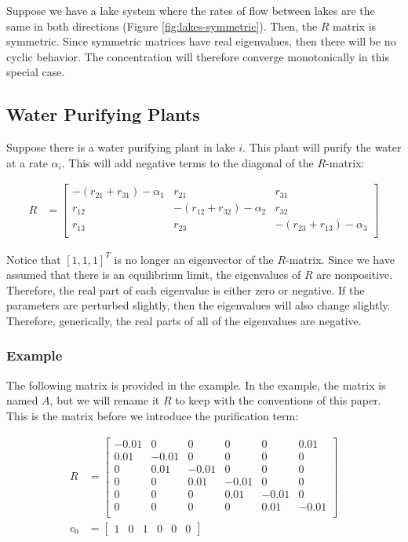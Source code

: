 \documentclass{article}
\begin{document}
Suppose we have a lake system where the rates of flow between lakes are the same
	in both directions (Figure \ref{fig:lakes-symmetric}).
Then, the $R$ matrix is symmetric.
Since symmetric matrices have real eigenvalues, then there will be no cyclic behavior.
The concentration will therefore converge monotonically in this special case.

\subsection{Water Purifying Plants}

Suppose there is a water purifying plant in lake $i$.
This plant will purify the water at a rate $\alpha_i$. 
This will add negative terms to the diagonal of the $R$-matrix:

\begin{align}
R & = \left[ \begin{matrix}
	- \left( r_{21} + r_{31} \right) - \alpha_1 & r_{21} & r_{31} \\
	r_{12} & - \left( r_{12} + r_{32} \right) - \alpha_2 & r_{32} \\
	r_{13} & r_{23} & - \left( r_{23} + r_{13} \right) - \alpha_3 \\
\end{matrix} \right] \label{eq:R-with-purification} 
\end{align}

Notice that $\left[ 1, 1, 1 \right]^T$ is no longer an eigenvector of the $R$-matrix.
Since we have assumed that there is an equilibrium limit, the eigenvalues of $R$ are
	nonpositive.
Therefore, the real part of each eigenvalue is either zero or negative.
If the parameters are perturbed slightly, then the eigenvalues will also change slightly.
Therefore, generically, the real parts of all of the eigenvalues are negative.

\subsubsection{Example}

The following matrix is provided in the example.
In the example, the matrix is named $A$, but we will rename it $R$ to keep 
	with the conventions of this paper.
This is the matrix before we introduce the purification term:

\begin{align*}
R & = \left[ \begin{matrix}
-0.01 & 0 & 0 & 0 & 0 & 0.01 \\
0.01 & -0.01 & 0 & 0 & 0 & 0 \\
0 & 0.01 & -0.01 & 0 & 0 & 0 \\
0 & 0 & 0.01 & -0.01 & 0 & 0 \\
0 & 0 & 0 & 0.01 & -0.01 & 0 \\
0 & 0 & 0 & 0 & 0.01 & -0.01 \\
\end{matrix} \right]\\
c_0 & = \left[ \begin{matrix} 1 & 0 & 1 & 0 & 0 & 0 \end{matrix} \right]
\end{align*}
\end{document}

